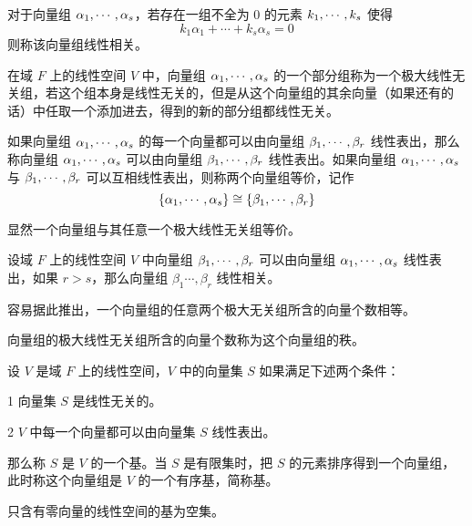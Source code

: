 \begin{definition}[线性相关]
    对于向量组 $\alpha_1,\cdots,\alpha_s$，若存在一组不全为 $0$ 的元素 $k_1,\cdots,k_s$ 使得
    \[ k_1\alpha_1 + \cdots + k_s\alpha_s = 0 \]
    则称该向量组线性相关。
\end{definition}

\begin{definition}
    在域 $F$ 上的线性空间 $V$ 中，向量组 $\alpha_1,\cdots,\alpha_s$ 的一个部分组称为一个极大线性无关组，若这个组本身是线性无关的，但是从这个向量组的其余向量（如果还有的话）中任取一个添加进去，得到的新的部分组都线性无关。
\end{definition}

\begin{definition}
    如果向量组 $\alpha_1,\cdots,\alpha_s$ 的每一个向量都可以由向量组 $\beta_1,\cdots,\beta_r$ 线性表出，那么称向量组 $\alpha_1,\cdots,\alpha_s$ 可以由向量组 $\beta_1,\cdots,\beta_r$ 线性表出。如果向量组 $\alpha_1,\cdots,\alpha_s$ 与 $\beta_1,\cdots,\beta_r$ 可以互相线性表出，则称两个向量组等价，记作
    \[ \{ \alpha_1, \cdots,\alpha_s \} \cong \{\beta_1,\cdots,\beta_r\}\]
\end{definition}

显然一个向量组与其任意一个极大线性无关组等价。

\begin{theorem}
    设域 $F$ 上的线性空间 $V$ 中向量组 $\beta_1,\cdots,\beta_r$ 可以由向量组 $\alpha_1,\cdots,\alpha_s$ 线性表出，如果 $r>s$，那么向量组 $\beta_1\cdots,\beta_r$ 线性相关。
\end{theorem}

容易据此推出，一个向量组的任意两个极大无关组所含的向量个数相等。

\begin{definition}
    向量组的极大线性无关组所含的向量个数称为这个向量组的秩。
\end{definition}

\begin{definition}
    设 $V$ 是域 $F$ 上的线性空间，$V$ 中的向量集 $S$ 如果满足下述两个条件：

    \num{1} 向量集 $S$ 是线性无关的。

    \num{2} $V$ 中每一个向量都可以由向量集 $S$ 线性表出。

    那么称 $S$ 是 $V$ 的一个基。当 $S$ 是有限集时，把 $S$ 的元素排序得到一个向量组，此时称这个向量组是 $V$ 的一个有序基，简称基。
\end{definition}

只含有零向量的线性空间的基为空集。

